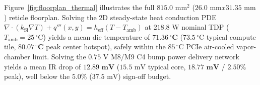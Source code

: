 \documentclass[10pt,journal,compsoc]{IEEEtran}
\def\texttt#1{#1}%
\def\times{x}%
\begin{document}
Figure~\ref{fig:floorplan_thermal} illustrates the full $815.0\text{ mm}^2$ ($26.0\text{ mm}\times 31.35\text{ mm}$) reticle floorplan. Solving the 2D steady-state heat conduction PDE $\nabla\cdot(k_{\text{Si}}\nabla T) + q'''(x,y) = h_{\text{eff}}(T - T_{\text{amb}})$ at $218.8\text{ W}$ nominal TDP ($T_{\text{amb}}=25\,^\circ\text{C}$) yields a mean die temperature of $\mathbf{71.36\,^\circ\text{C}}$ ($73.5\,^\circ\text{C}$ typical compute tile, $\mathbf{80.07\,^\circ\text{C}}$ peak center hotspot), safely within the $85\,^\circ\text{C}$ PCIe air-cooled vapor-chamber limit. Solving the $0.75\text{ V}$ \texttt{M8/M9} C4 bump power delivery network yields a mean IR drop of $\mathbf{12.89\text{ mV}}$ ($15.5\text{ mV}$ typical core, $\mathbf{18.77\text{ mV}}$ / $\mathbf{2.50\%}$ peak), well below the $5.0\%$ ($37.5\text{ mV}$) sign-off budget.
\end{document}
